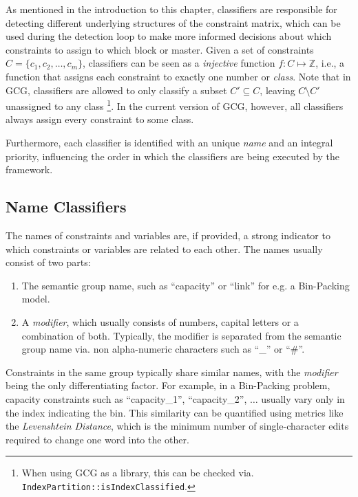 		As mentioned in the introduction to this chapter, classifiers are responsible for detecting different underlying structures of the constraint matrix, which can be used during the detection loop to make more informed decisions about which constraints to assign to which block or master.
		Given a set of constraints $C = \{ c_1, c_2, \ldots, c_m \}$, classifiers can be seen as a \textit{injective} function $f: C \mapsto \mathbb{Z}$, i.e., a function that assigns each constraint to exactly one number or \textit{class}.
		Note that in \acs{GCG}, classifiers are allowed to only classify a subset $C' \subseteq C$, leaving $C \setminus C'$ unassigned to any class \footnote{When using \ac{GCG} as a library, this can be checked via. \lstinline|IndexPartition::isIndexClassified|.}.
		In the current version of \ac{GCG}, however, all classifiers always assign every constraint to some class.
		
		Furthermore, each classifier is identified with an unique \textit{name} and an integral priority, influencing the order in which the classifiers are being executed by the framework. 
		
		\subsection{Name Classifiers}
		\label{chap:gcg:classifiers:name}
		
			The names of constraints and variables are, if provided, a strong indicator to which constraints or variables are related to each other.
			The names usually consist of two parts:
			\begin{enumerate}
				\item The semantic group name, such as \enquote{capacity} or \enquote{link} for e.g. a Bin-Packing model. 
				\item A \textit{modifier}, which usually consists of numbers, capital letters or a combination of both. Typically, the modifier is separated from the semantic group name via.  non alpha-numeric characters such as \enquote{\_} or \enquote{\#}.
			\end{enumerate}
		
			Constraints in the same group typically share similar names, with the \textit{modifier} being the only differentiating factor. For example, in a Bin-Packing problem, capacity constraints such as \enquote{capacity\_1}, \enquote{capacity\_2}, $\ldots$ usually vary only in the index indicating the bin. This similarity can be quantified using metrics like the \textit{Levenshtein Distance}, which is the minimum number of single-character edits required to change one word into the other.
			
